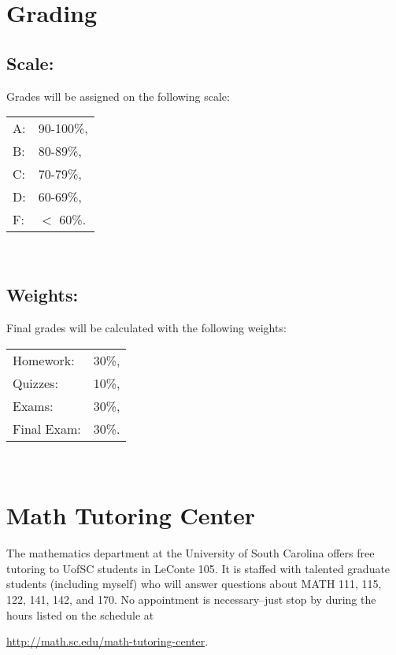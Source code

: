 \documentclass[10pt]{amsart}
\begin{document}
\newpage

\section*{Grading}
\subsection*{Scale:}
Grades will be assigned on the following scale:
\begin{center}
  \begin{tabular}{ll}
    A: &90-100\%,\\
    B: & 80-89\%,\\
    C: & 70-79\%,\\
    D: & 60-69\%,\\
    F: & $<$ 60\%.\\
  \end{tabular}\\
\end{center}
\subsection*{Weights:}
Final grades will be calculated with the following weights:
\begin{center}
  \begin{tabular}{lr}
    Homework: & 30\%,\\
    Quizzes: &10\%,\\
    Exams: & 30\%,\\
    Final Exam: & 30\%.\\
  \end{tabular}\\
\end{center}

\section*{Math Tutoring Center}
\noindent
The mathematics department at the University of South Carolina offers free tutoring to UofSC students in LeConte 105.
It is staffed with talented graduate students (including myself) who will answer questions about MATH 111, 115, 122, 141, 142, and 170.
No appointment is necessary--just stop by during the hours listed on the schedule at
\begin{center}
  \url{http://math.sc.edu/math-tutoring-center}.
\end{center}
\end{document}
